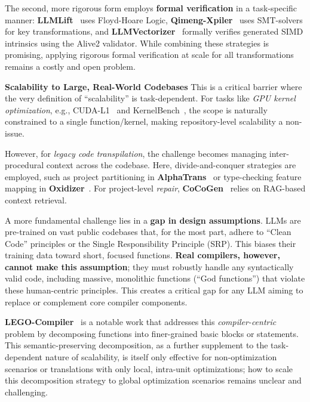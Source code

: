 \documentclass[pdflatex,sn-mathphys-ay,twocolumn, a4paper]{sn-jnl}%
\theoremstyle{thmstyleone}%
\theoremstyle{thmstyletwo}%
\theoremstyle{thmstylethree}%
\begin{document}
The second, more rigorous form employs \textbf{formal verification} in a task-specific manner: \textbf{LLMLift}~\citep{81_bhatia2024_neurips} uses Floyd-Hoare Logic, \textbf{Qimeng-Xpiler}~\citep{10_qimengxpiler2025_osdi} uses SMT-solvers for key transformations, and \textbf{LLMVectorizer}~\citep{47_llmvectorizer2025_cgo} formally verifies generated SIMD intrinsics using the Alive2 validator. While combining these strategies is promising, applying rigorous formal verification at scale for all transformations remains a costly and open problem.

\textbf{Scalability to Large, Real-World Codebases}
This is a critical barrier where the very definition of ``scalability'' is task-dependent. For tasks like \textit{GPU kernel optimization}, e.g., CUDA-L1~\citep{cudal1_2025_arxiv} and KernelBench~\citep{kernelbench_2025_icml}, the scope is naturally constrained to a single function/kernel, making repository-level scalability a non-issue.

However, for \textit{legacy code transpilation}, the challenge becomes managing inter-procedural context across the codebase. Here, divide-and-conquer strategies are employed, such as project partitioning in \textbf{AlphaTrans}~\citep{91_alphatrans2025_fse} or type-checking feature mapping in \textbf{Oxidizer}~\citep{60_zhang2025_pldi}. For project-level \textit{repair}, \textbf{CoCoGen}~\citep{110_bi-etal-2024-iterative} relies on RAG-based context retrieval.

A more fundamental challenge lies in a \textbf{gap in design assumptions}. LLMs are pre-trained on vast public codebases that, for the most part, adhere to ``Clean Code'' principles or the Single Responsibility Principle (SRP). This biases their training data toward short, focused functions. \textbf{Real compilers, however, cannot make this assumption}; they must robustly handle any syntactically valid code, including massive, monolithic functions (``God functions'') that violate these human-centric principles. This creates a critical gap for any LLM aiming to replace or complement core compiler components.

\textbf{LEGO-Compiler}~\citep{5_legocompiler-arxiv25} is a notable work that addresses this \textit{compiler-centric} problem by decomposing functions into finer-grained basic blocks or statements. This semantic-preserving decomposition, as a further supplement to the task-dependent nature of scalability, is itself only effective for non-optimization scenarios or translations with only local, intra-unit optimizations; how to scale this decomposition strategy to global optimization scenarios remains unclear and challenging.
\end{document}
